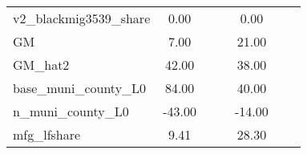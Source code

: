 \begin{table}[htbp]
\begin{tabular}{l*{2}{ccc}}
v2\_blackmig3539\_share&        0.00&            &            &        0.00&            &            \\
GM                  &        7.00&            &            &       21.00&            &            \\
GM\_hat2             &       42.00&            &            &       38.00&            &            \\
base\_muni\_county\_L0 &       84.00&            &            &       40.00&            &            \\
n\_muni\_county\_L0    &      -43.00&            &            &      -14.00&            &            \\
mfg\_lfshare         &        9.41&            &            &       28.30&            &            \\
\bottomrule
\end{tabular}
\end{table}
